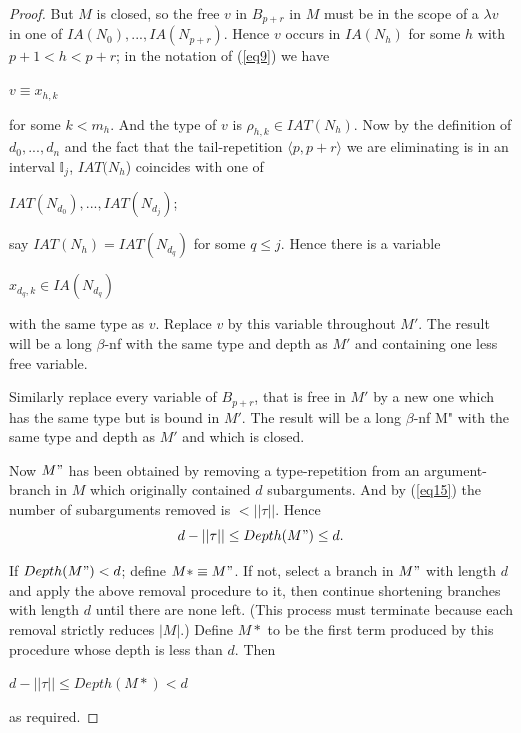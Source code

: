 \documentclass[a4paper,10pt]{article}
\begin{document}
\begin{lem}
\begin{proof}
But $M$ is closed, so the free $v$ in $B_{p+r}$ in $M$ must be in the scope of a $\lambda v$ in one of
$IA(N_0), ..., IA(N_{p+r})$. Hence $v$ occurs in $IA(N_h)$ for some $h$ with $p + 1 < h < p + r$;
in the notation of (\ref{eq9}) we have
\begin{center}
 $v \equiv x_{h, k}$
\end{center}
for some $k < m_h$. And the type of $v$ is $\rho_{h,k} \in IAT(N_h)$. Now by the definition of
$d_0, ..., d_n$ and the fact that the tail-repetition $\langle p, p + r\rangle$ we are eliminating is in an
interval $\mathbb{I}_j$, $IAT(N_h$) coincides with one of
\begin{center}
 $IAT(N_{d_0}),..., IAT(N_{d_j})$;
\end{center}
say $IAT(N_h) = IAT(N_{d_q})$ for some $q \leq j$. Hence there is a variable
\begin{center}
 $x_{d_q,k} \in IA(N_{d_q})$
\end{center}
with the same type as $v$. Replace $v$ by this variable throughout $M'$. The result will
be a long $\beta$-nf with the same type and depth as $M'$ and containing one less free
variable.

Similarly replace every variable of $B_{p + r}$, that is free in $M'$ by a new one which has
the same type but is bound in $M'$. The result will be a long $\beta$-nf M" with the same
type and depth as $M'$ and which is closed.

Now $M"$ has been obtained by removing a type-repetition from an argument-branch in 
$M$ which originally contained $d$ subarguments. And by (\ref{eq15}) the number of
subarguments removed is $< ||\tau||$. Hence
\begin{equation}\label{eq17}
  d - ||\tau|| \leq Depth(M") \leq d.
\end{equation}

If $Depth(M") < d$; define $M* \equiv M"$. If not, select a branch in $M"$ with length
$d$ and apply the above removal procedure to it, then continue shortening branches
with length $d$ until there are none left. (This process must terminate because each
removal strictly reduces $|M|$.) Define $M*$ to be the first term produced by this
procedure whose depth is less than $d$. Then
\begin{center}
 $d - ||\tau|| \leq Depth(M*) < d$
\end{center}
as required.

\end{proof} 
\end{lem}
\end{document}
